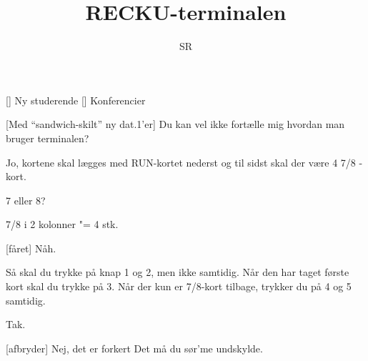 \documentclass[a4paper,11pt]{article}
\title{RECKU-terminalen}
\author{SR}
\begin{document}
\maketitle

\begin{roles}
[] Ny studerende
[] Konferencier
\end{roles}

\begin{sketch}

  [Med "`sandwich-skilt"' ny dat.1'er] Du kan vel ikke
  fortælle mig hvordan man bruger terminalen?

   Jo, kortene skal lægges med RUN-kortet nederst og til sidst
  skal der være 4 7/8 -kort.

 7 eller 8?

 7/8 i 2 kolonner "= 4 stk.

[fåret] Nåh.

 Så skal du trykke på knap 1 og 2, men ikke samtidig.  Når den
har taget første kort skal du trykke på 3.  Når der kun er 7/8-kort
tilbage, trykker du på 4 og 5 samtidig.

 Tak. 

[afbryder] Nej, det er forkert  Det må du sør'me undskylde.



\end{sketch}
\end{document}
